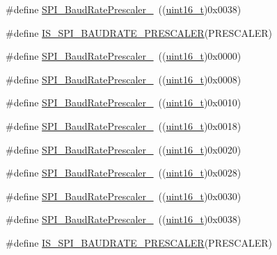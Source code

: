 \begin{DoxyCompactItemize}
\#define \hyperlink{group___s_p_i___baud_rate___prescaler_ga1e1aa6406f0e88ac557ba49fb8069e3e}{S\+P\+I\+\_\+\+Baud\+Rate\+Prescaler\+\_}~((\hyperlink{_p_e___types_8h_a1f1825b69244eb3ad2c7165ddc99c956}{uint16\+\_\+t})0x0038)
\item 
\#define \hyperlink{group___s_p_i___baud_rate___prescaler_gae79f46ed9f91e39dc1f6912cb25fc716}{I\+S\+\_\+\+S\+P\+I\+\_\+\+B\+A\+U\+D\+R\+A\+T\+E\+\_\+\+P\+R\+E\+S\+C\+A\+L\+ER}(P\+R\+E\+S\+C\+A\+L\+ER)
\item 
\#define \hyperlink{group___s_p_i___baud_rate___prescaler_ga88cd6d416c87b382396dbf4c02e3bd4b}{S\+P\+I\+\_\+\+Baud\+Rate\+Prescaler\+\_}~((\hyperlink{_p_e___types_8h_a1f1825b69244eb3ad2c7165ddc99c956}{uint16\+\_\+t})0x0000)
\item 
\#define \hyperlink{group___s_p_i___baud_rate___prescaler_ga17ac4858cb9387289ee7c3d94a9b54be}{S\+P\+I\+\_\+\+Baud\+Rate\+Prescaler\+\_}~((\hyperlink{_p_e___types_8h_a1f1825b69244eb3ad2c7165ddc99c956}{uint16\+\_\+t})0x0008)
\item 
\#define \hyperlink{group___s_p_i___baud_rate___prescaler_ga023a1e4c04586f2feb0d4b03b2e0c230}{S\+P\+I\+\_\+\+Baud\+Rate\+Prescaler\+\_}~((\hyperlink{_p_e___types_8h_a1f1825b69244eb3ad2c7165ddc99c956}{uint16\+\_\+t})0x0010)
\item 
\#define \hyperlink{group___s_p_i___baud_rate___prescaler_ga5ef8587bb96e3ec98e9fde770756fc7d}{S\+P\+I\+\_\+\+Baud\+Rate\+Prescaler\+\_}~((\hyperlink{_p_e___types_8h_a1f1825b69244eb3ad2c7165ddc99c956}{uint16\+\_\+t})0x0018)
\item 
\#define \hyperlink{group___s_p_i___baud_rate___prescaler_ga1d30cecaa412cee5250c69644207c652}{S\+P\+I\+\_\+\+Baud\+Rate\+Prescaler\+\_}~((\hyperlink{_p_e___types_8h_a1f1825b69244eb3ad2c7165ddc99c956}{uint16\+\_\+t})0x0020)
\item 
\#define \hyperlink{group___s_p_i___baud_rate___prescaler_ga2c9cd96ed56432a83f8e4f46fbecb5e6}{S\+P\+I\+\_\+\+Baud\+Rate\+Prescaler\+\_}~((\hyperlink{_p_e___types_8h_a1f1825b69244eb3ad2c7165ddc99c956}{uint16\+\_\+t})0x0028)
\item 
\#define \hyperlink{group___s_p_i___baud_rate___prescaler_gafa6c39c3ee16a08730356a5cd30f3648}{S\+P\+I\+\_\+\+Baud\+Rate\+Prescaler\+\_}~((\hyperlink{_p_e___types_8h_a1f1825b69244eb3ad2c7165ddc99c956}{uint16\+\_\+t})0x0030)
\item 
\#define \hyperlink{group___s_p_i___baud_rate___prescaler_ga1e1aa6406f0e88ac557ba49fb8069e3e}{S\+P\+I\+\_\+\+Baud\+Rate\+Prescaler\+\_}~((\hyperlink{_p_e___types_8h_a1f1825b69244eb3ad2c7165ddc99c956}{uint16\+\_\+t})0x0038)
\item 
\#define \hyperlink{group___s_p_i___baud_rate___prescaler_gae79f46ed9f91e39dc1f6912cb25fc716}{I\+S\+\_\+\+S\+P\+I\+\_\+\+B\+A\+U\+D\+R\+A\+T\+E\+\_\+\+P\+R\+E\+S\+C\+A\+L\+ER}(P\+R\+E\+S\+C\+A\+L\+ER)
\end{DoxyCompactItemize}



